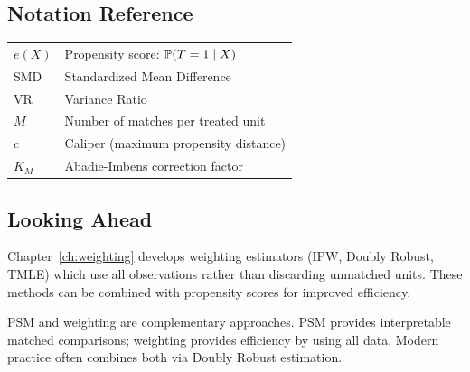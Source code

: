 \subsection{Notation Reference}

\begin{center}
\begin{tabular}{ll}
$e(X)$ & Propensity score: $\mathbb{P}(T=1 \mid X)$ \\
SMD & Standardized Mean Difference \\
VR & Variance Ratio \\
$M$ & Number of matches per treated unit \\
$c$ & Caliper (maximum propensity distance) \\
$K_M$ & Abadie-Imbens correction factor
\end{tabular}
\end{center}

\subsection{Looking Ahead}

Chapter~\ref{ch:weighting} develops weighting estimators (IPW, Doubly Robust, TMLE) which use all observations rather than discarding unmatched units. These methods can be combined with propensity scores for improved efficiency.

\begin{insight}
PSM and weighting are complementary approaches. PSM provides interpretable matched comparisons; weighting provides efficiency by using all data. Modern practice often combines both via Doubly Robust estimation.
\end{insight}
